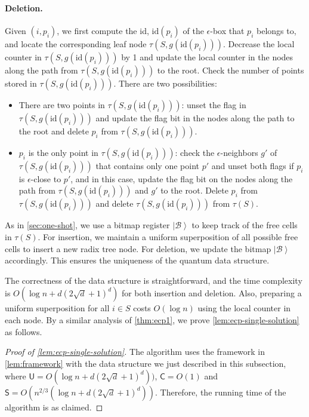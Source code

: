 \documentclass[10pt,a4paper]{article}
\newcommand{\ket}[1]{\left| #1 \right\rangle}
\newcommand{\id}{\mathrm{id}}
\begin{document}
\paragraph{Deletion.} Given $(i, p_i)$, we first compute the id, $\id(p_i)$ of the $\epsilon$-box that $p_i$ belongs to, and locate the corresponding leaf node $\tau(S, g(\id(p_i)))$. Decrease the local counter in $\tau(S, g(\id(p_i)))$ by 1 and update the local counter in the nodes along the path from $\tau(S, g(\id(p_i)))$ to the root. Check the number of points stored in $\tau(S, g(\id(p_i)))$. There are two possibilities:
\begin{itemize}
  \item There are two points in $\tau(S, g(\id(p_i)))$: unset the flag in $\tau(S, g(\id(p_i)))$ and update the flag bit in the nodes along the path to the root and delete $p_i$ from $\tau(S, g(\id(p_i)))$.
  \item $p_i$ is the only point in $\tau(S, g(\id(p_i)))$: check the $\epsilon$-neighbors $g'$ of $\tau(S, g(\id(p_i)))$ that contains only one point $p'$ and unset both flags if $p_i$ is $\epsilon$-close to $p'$, and in this case, update the flag bit on the nodes along the path from $\tau(S, g(\id(p_i)))$ and $g'$ to the root. Delete $p_i$ from $\tau(S, g(\id(p_i)))$ and delete $\tau(S, g(\id(p_i)))$ from $\tau(S)$.
\end{itemize}

As in \cref{sec:one-shot}, we use a bitmap register $\ket{\mathcal{B}}$ to keep track of the free cells in $\tau(S)$. For insertion, we maintain a uniform superposition of all possible free cells to insert a new radix tree node. For deletion, we update the bitmap $\ket{\mathcal{B}}$ accordingly. This ensures the uniqueness of the quantum data structure.

The correctness of the data structure is straightforward, and the time complexity is $O(\log n + d(2\sqrt{d}+1)^d)$ for both insertion and deletion. Also, preparing a uniform superposition for all $i \in S$ costs $O(\log n)$ using the local counter in each node. By a similar analysis of \cref{thm:ecp1}, we prove \cref{lem:ecp-single-solution} as follows.

\begin{proof}[Proof of \cref{lem:ecp-single-solution}]
The algorithm uses the framework in \cref{lem:framework} with the data structure we just described in this subsection, where $\mathsf{U} = O(\log n + d(2\sqrt{d}+1)^d))$,  $\mathsf{C} = O(1)$ and $\mathsf{S} = O(n^{2/3}(\log n + d(2\sqrt{d}+1)^d))$. 
%
Therefore, the running time of the algorithm is as claimed.
\end{proof}
\end{document}
